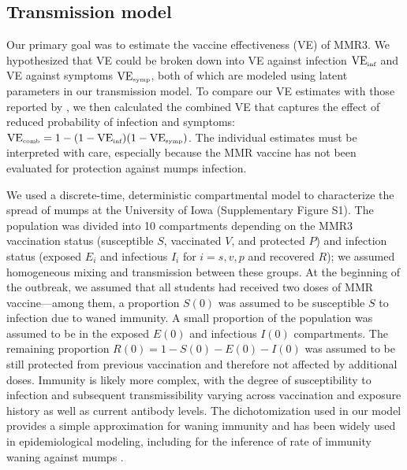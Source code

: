 \documentclass[12pt]{article}
\begin{document}
\subsection{Transmission model}

Our primary goal was to estimate the vaccine effectiveness (VE) of MMR3.
We hypothesized that VE could be broken down into VE against infection $\mathrm{VE}_{\textrm{\tiny{inf}}}$ and VE against symptoms $\mathrm{VE}_{\textrm{\tiny{symp}}}$, both of which are modeled using latent parameters in our transmission model.
To compare our VE estimates with those reported by \cite{cardemil2017effectiveness}, we then calculated the combined VE that captures the effect of reduced probability of infection and symptoms: $\mathrm{VE}_{\textrm{\tiny{comb}}} = 1 - (1 - \mathrm{VE}_{\textrm{\tiny{inf}}})(1- \mathrm{VE}_{\textrm{\tiny{symp}}})$.
The individual estimates must be interpreted with care, especially because the MMR vaccine has not been evaluated for protection against mumps infection. 

We used a discrete-time, deterministic compartmental model to characterize the spread of mumps at the University of Iowa (Supplementary Figure S1).
The population was divided into 10 compartments depending on the MMR3 vaccination status (susceptible $S$, vaccinated $V$, and protected $P$) and infection status (exposed $E_i$ and infectious $I_i$ for $i = s, v, p$ and recovered $R$); we assumed homogeneous mixing and transmission between these groups.
At the beginning of the outbreak, we assumed that all students had received two doses of MMR vaccine---among them, a proportion $S(0)$ was assumed to be susceptible $S$ to infection due to waned immunity.
A small proportion of the population was assumed to be in the exposed $E(0)$ and infectious $I(0)$ compartments.
The remaining proportion $R(0) = 1-S(0) - E(0) - I(0)$ was assumed to be still protected from previous vaccination and therefore not affected by additional doses.
Immunity is likely more complex, with the degree of susceptibility to infection and subsequent transmissibility varying across vaccination and exposure history as well as current antibody levels.
The dichotomization used in our model provides a simple approximation for waning immunity and has been widely used in epidemiological modeling, including for the inference of rate of immunity waning against mumps \citep{lewnard2018vaccine}.
\end{document}
